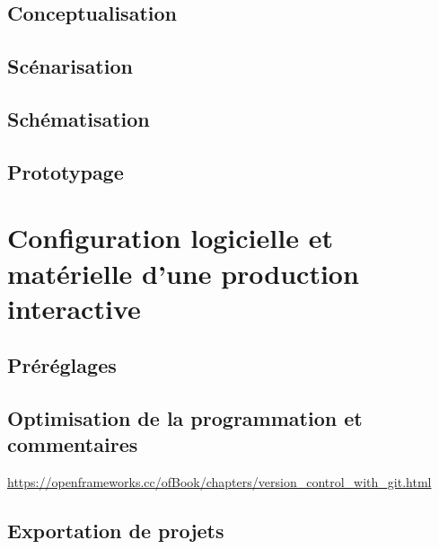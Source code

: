\documentclass[
]{book}
\begin{document}
\hypertarget{conceptualisation}{%
\subsection{Conceptualisation}\label{conceptualisation}}

\hypertarget{scuxe9narisation}{%
\subsection{Scénarisation}\label{scuxe9narisation}}

\hypertarget{schuxe9matisation}{%
\subsection{Schématisation}\label{schuxe9matisation}}

\hypertarget{prototypage}{%
\subsection{Prototypage}\label{prototypage}}

\hypertarget{configuration-logicielle-et-matuxe9rielle-dune-production-interactive}{%
\section{Configuration logicielle et matérielle d'une production interactive}\label{configuration-logicielle-et-matuxe9rielle-dune-production-interactive}}

\hypertarget{pruxe9ruxe9glages}{%
\subsection{Préréglages}\label{pruxe9ruxe9glages}}

\hypertarget{optimisation-de-la-programmation-et-commentaires}{%
\subsection{Optimisation de la programmation et commentaires}\label{optimisation-de-la-programmation-et-commentaires}}

\url{https://openframeworks.cc/ofBook/chapters/version_control_with_git.html}

\hypertarget{exportation-de-projets}{%
\subsection{Exportation de projets}\label{exportation-de-projets}}
\end{document}
